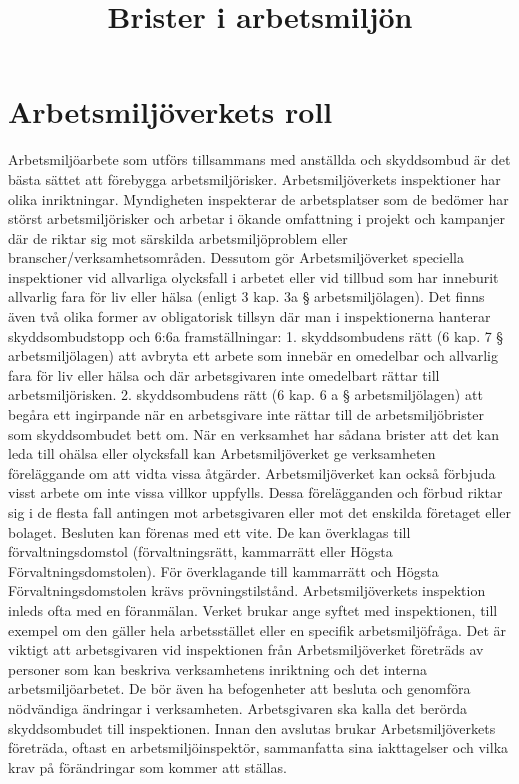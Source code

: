 \title{
Brister i arbetsmiljön
}
\section*{Arbetsmiljöverkets roll}
Arbetsmiljöarbete som utförs tillsammans med anställda och skyddsombud är det bästa sättet att förebygga arbetsmiljörisker.
Arbetsmiljöverkets inspektioner har olika inriktningar. Myndigheten inspekterar de arbetsplatser som de bedömer har störst arbetsmiljörisker och arbetar i ökande omfattning i projekt och kampanjer där de riktar sig mot särskilda arbetsmiljöproblem eller branscher/verksamhetsområden.
Dessutom gör Arbetsmiljöverket speciella inspektioner vid allvarliga olycksfall i arbetet eller vid tillbud som har inneburit allvarlig fara för liv eller hälsa (enligt 3 kap. 3a § arbetsmiljölagen).
Det finns även två olika former av obligatorisk tillsyn där man i inspektionerna hanterar skyddsombudstopp och 6:6a framställningar:
1. skyddsombudens rätt (6 kap. 7 § arbetsmiljölagen) att avbryta ett arbete som innebär en omedelbar och allvarlig fara för liv eller hälsa och där arbetsgivaren inte omedelbart rättar till arbetsmiljörisken.
2. skyddsombudens rätt (6 kap. 6 a § arbetsmiljölagen) att begåra ett ingirpande när en arbetsgivare inte rättar till de arbetsmiljöbrister som skyddsombudet bett om.
När en verksamhet har sådana brister att det kan leda till ohälsa eller olycksfall kan Arbetsmiljöverket ge verksamheten föreläggande om att vidta vissa åtgärder. Arbetsmiljöverket kan också förbjuda visst arbete om inte vissa villkor uppfylls. Dessa förelägganden och förbud riktar sig i de flesta fall antingen mot arbetsgivaren eller mot det enskilda företaget eller bolaget. Besluten kan förenas med ett vite. De kan överklagas till förvaltningsdomstol (förvaltningsrätt, kammarrätt eller Högsta Förvaltningsdomstolen). För överklagande till kammarrätt och Högsta Förvaltningsdomstolen krävs prövningstilstånd.
Arbetsmiljöverkets inspektion inleds ofta med en föranmälan. Verket brukar ange syftet med inspektionen, till exempel om den gäller hela arbetsstället eller en specifik arbetsmiljöfråga.
Det är viktigt att arbetsgivaren vid inspektionen från Arbetsmiljöverket företräds av personer som kan beskriva verksamhetens inriktning och det interna arbetsmiljöarbetet. De bör även ha befogenheter att besluta och genomföra nödvändiga ändringar i verksamheten.
Arbetsgivaren ska kalla det berörda skyddsombudet till inspektionen. Innan den avslutas brukar Arbetsmiljöverkets företräda, oftast en arbetsmiljöinspektör, sammanfatta sina iakttagelser och vilka krav på förändringar som kommer att ställas.

